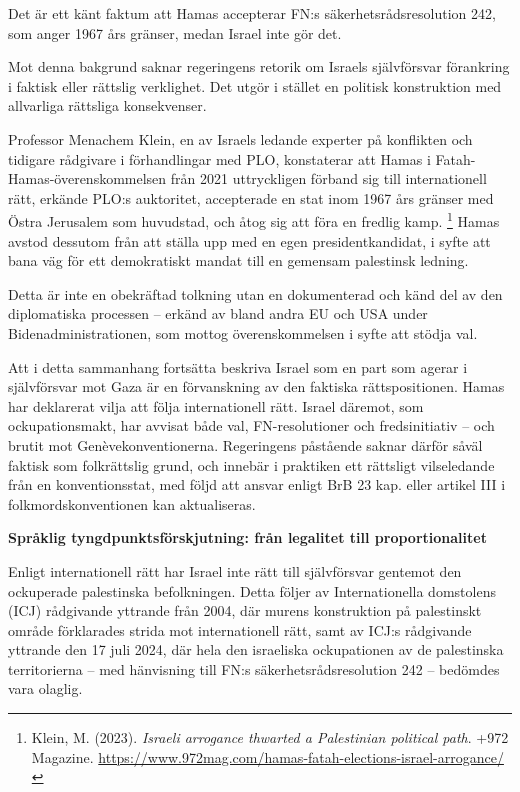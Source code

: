 Det är ett känt faktum att Hamas accepterar FN:s säkerhetsrådsresolution 242, som anger 1967 års gränser, medan Israel inte gör det.

Mot denna bakgrund saknar regeringens retorik om Israels självförsvar förankring i faktisk eller rättslig verklighet. 
Det utgör i stället en politisk konstruktion med allvarliga rättsliga konsekvenser.

Professor Menachem Klein, en av Israels ledande experter på konflikten och tidigare rådgivare i förhandlingar med PLO, 
konstaterar att Hamas i Fatah-Hamas-överenskommelsen från 2021 uttryckligen förband sig till internationell rätt, 
erkände PLO:s auktoritet, accepterade en stat inom 1967 års gränser med Östra Jerusalem som huvudstad, 
och åtog sig att föra en fredlig kamp.%
\footnote{Klein, M. (2023). \textit{Israeli arrogance thwarted a Palestinian political path}. +972 Magazine. \url{https://www.972mag.com/hamas-fatah-elections-israel-arrogance/}} 
Hamas avstod dessutom från att ställa upp med en egen presidentkandidat, i syfte att bana väg för ett demokratiskt mandat 
till en gemensam palestinsk ledning.

Detta är inte en obekräftad tolkning utan en dokumenterad och känd del av den diplomatiska processen – erkänd av 
bland andra EU och USA under Bidenadministrationen, som mottog överenskommelsen i syfte att stödja val.

Att i detta sammanhang fortsätta beskriva Israel som en part som agerar i självförsvar mot Gaza är en förvanskning 
av den faktiska rättspositionen. Hamas har deklarerat vilja att följa internationell rätt. Israel däremot, som ockupationsmakt, 
har avvisat både val, FN-resolutioner och fredsinitiativ – och brutit mot Genèvekonventionerna. 
Regeringens påstående saknar därför såväl faktisk som folkrättslig grund, och innebär i praktiken ett rättsligt vilseledande 
från en konventionsstat, med följd att ansvar enligt BrB 23 kap. eller artikel III i folkmordskonventionen 
kan aktualiseras.

\medskip

\textbf{Språklig tyngdpunktsförskjutning: från legalitet till proportionalitet}

Enligt internationell rätt har Israel inte rätt till självförsvar gentemot den ockuperade palestinska befolkningen. 
Detta följer av Internationella domstolens (ICJ) rådgivande yttrande från 2004, där murens konstruktion på palestinskt område 
förklarades strida mot internationell rätt, samt av ICJ:s rådgivande yttrande den 17 juli 2024, där hela den israeliska 
ockupationen av de palestinska territorierna – med hänvisning till FN:s säkerhetsrådsresolution 242 – bedömdes vara olaglig. 


